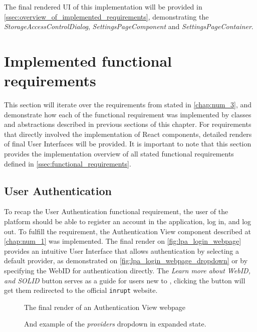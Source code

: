 The final rendered UI of this implementation will be provided in \autoref{ssec:overview_of_implemented_requirements}, demonstrating the \textit{StorageAccessControlDialog}, \textit{SettingsPageComponent} and \textit{SettingsPageContainer}.

\section{Implemented functional requirements}
\label{ssec:overview_of_implemented_requirements}

This section will iterate over the requirements from \lpa{} stated in \autoref{chap:num_3}, and demonstrate how each of the functional requirement was implemented by classes and abstractions described in previous sections of this chapter. For requirements that directly involved the implementation of React components, detailed renders of final User Interfaces will be provided. It is important to note that this section provides the implementation overview of all stated functional requirements defined in \autoref{ssec:functional_requirements}.

\subsection{User Authentication}

To recap the User Authentication functional requirement, the user of the platform should be able to register an account in the application, log in, and log out. To fulfill the requirement, the Authentication View component described at \autoref{chap:num_1} was implemented. The final render on \autoref{fig:lpa_login_webpage} provides an intuitive User Interface that allows authentication by selecting a default \solid{} provider, as demonstrated on \autoref{fig:lpa_login_webpage_dropdown} or by specifying the WebID for authentication directly. The \textit{Learn more about WebID, and SOLID} button serves as a guide for users new to \solid{}, clicking the button will get them redirected to the official \texttt{inrupt} website. 

\begin{figure}[hbt]
  \caption{The final render of an Authentication View webpage}
  \label{fig:lpa_login_webpage}
\endminipage\hfill
{}
  \caption{And example of the \textit{providers} dropdown in expanded state.}
  \label{fig:lpa_login_webpage_dropdown}
\endminipage\hfill
\end{figure}

